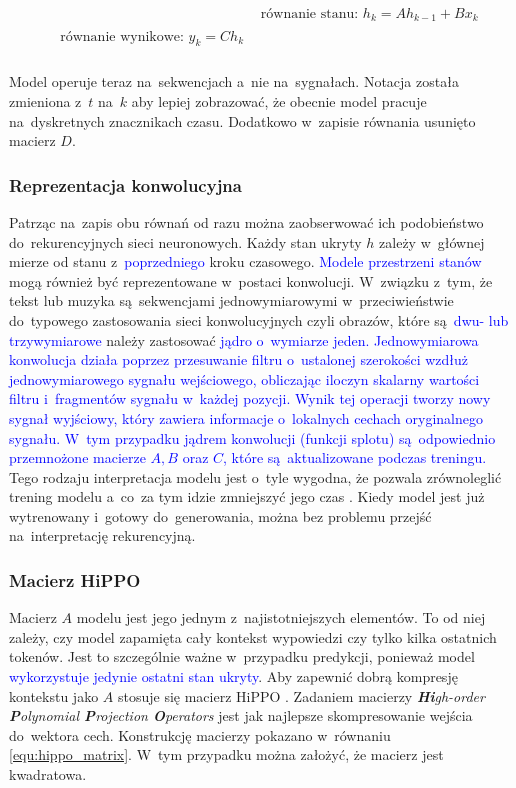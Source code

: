 \documentclass[data-science]{agh-wi} %
\begin{document}
\begin{align}
     & \text{równanie stanu: }h_k = Ah_{k-1} + Bx_k \label{equ:rownanie_stanu_seq} \\
    \begin{split}
        &\text{równanie wynikowe: }y_k = Ch_k \label{equ:rownanie_wynikowe_seq} \\
    \end{split}
\end{align}

Model operuje teraz na~sekwencjach a~nie na~sygnałach. Notacja została zmieniona z~$t$ na~$k$ aby lepiej zobrazować, że obecnie model pracuje na~dyskretnych znacznikach czasu. Dodatkowo w~zapisie równania usunięto macierz $D$.

\subsubsection*{Reprezentacja konwolucyjna}
Patrząc na~zapis obu równań od razu można zaobserwować ich podobieństwo do~rekurencyjnych sieci neuronowych. Każdy stan ukryty $h$ zależy w~głównej mierze od stanu z~\textcolor{blue}{poprzedniego} kroku czasowego. \textcolor{blue}{Modele przestrzeni stanów} mogą również być reprezentowane w~postaci konwolucji. W~związku z~tym, że tekst lub muzyka są~sekwencjami jednowymiarowymi w~przeciwieństwie do~typowego zastosowania sieci konwolucyjnych czyli obrazów, które są~\textcolor{blue}{dwu- lub trzywymiarowe} należy zastosować \textcolor{blue}{jądro o~wymiarze jeden.  Jednowymiarowa konwolucja działa poprzez przesuwanie filtru o~ustalonej szerokości wzdłuż jednowymiarowego sygnału wejściowego, obliczając iloczyn skalarny wartości filtru i~fragmentów sygnału w~każdej pozycji. Wynik tej operacji tworzy nowy sygnał wyjściowy, który zawiera informacje o~lokalnych cechach oryginalnego sygnału. W~tym przypadku jądrem konwolucji (funkcji splotu) są~odpowiednio przemnożone macierze $A, B$ oraz $C$, które są~aktualizowane podczas treningu.} Tego rodzaju interpretacja modelu jest o~tyle wygodna, że pozwala zrównoleglić trening modelu a~co~za tym idzie zmniejszyć jego czas \cite{ssm_notacja}. Kiedy model jest już wytrenowany i~gotowy do~generowania, można bez problemu przejść na~interpretację rekurencyjną.

\subsubsection*{Macierz HiPPO}
Macierz $A$ modelu jest jego jednym z~najistotniejszych elementów. To od niej zależy, czy model zapamięta cały kontekst wypowiedzi czy tylko kilka ostatnich tokenów. Jest to szczególnie ważne w~przypadku predykcji, ponieważ model \textcolor{blue}{wykorzystuje jedynie ostatni stan ukryty}. Aby zapewnić dobrą kompresję kontekstu jako $A$ stosuje się macierz HiPPO \cite{hippo}. Zadaniem macierzy \textit{\textbf{Hi}gh-order \textbf{P}olynomial \textbf{P}rojection \textbf{O}perators} jest jak najlepsze skompresowanie wejścia do~wektora cech. Konstrukcję macierzy pokazano w~równaniu \ref*{equ:hippo_matrix}. W~tym przypadku można założyć, że macierz jest kwadratowa.
\end{document}
